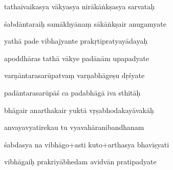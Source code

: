 \documentclass[article,12pt,a4paper]{memoir}%
\newcounter{parCount}
\begin{document}
	  
	  \pstart {} tathaivaikasya vākyasya nirākāṅkṣasya sarvataḥ 
	{}
	\pend%
      

	  
	  \pstart \leavevmode%
	śabdāntaraiḥ samākhyānaṃ sākāṅkṣair anugamyate 
	{}
	\pend%
      

	  
	  \pstart {} yathā pade vibhajyante prakṛtipratyayādayaḥ 
	{}
	\pend%
      

	  
	  \pstart \leavevmode%
	apoddhāras tathā vākye padānām upapadyate 
	{}
	\pend%
      

	  
	  \pstart {} varṇāntarasarūpatvaṃ varṇabhāgeṣu dṛśyate 
	{}
	\pend%
      

	  
	  \pstart \leavevmode%
	padāntarasarūpāś ca padabhāgā iva sthitāḥ 
	{}
	\pend%
      

	  
	  \pstart {} bhāgair anarthakair yuktā vṛṣabhodakayāvakāḥ 
	{}
	\pend%
      

	  
	  \pstart \leavevmode%
	anvayavyatirekau tu vyavahāranibandhanam 
	{}
	\pend%
      

	  
	  \pstart {} śabdasya na vibhāgo+asti kuto+arthasya bhaviṣyati 
	{}
	\pend%
      

	  
	  \pstart \leavevmode%
	vibhāgaiḥ prakriyābhedam avidvān pratipadyate 
	{}
	\pend%
      
\end{document}
